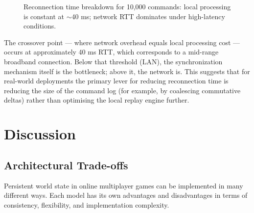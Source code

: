 \documentclass{article}
\begin{document}
\begin{figure}[h]
\centering
{}
\caption{Reconnection time breakdown for 10{,}000 commands: local processing is constant at $\sim$40 ms; network RTT dominates under high-latency conditions.}
\label{fig:network}
\end{figure}

The crossover point — where network overhead equals local processing cost — occurs at approximately 40 ms RTT, which corresponds to a mid-range broadband connection. Below that threshold (LAN), the synchronization mechanism itself is the bottleneck; above it, the network is. This suggests that for real-world deployments the primary lever for reducing reconnection time is reducing the size of the command log (for example, by coalescing commutative deltas) rather than optimising the local replay engine further.

\newpage

\section{Discussion}
\label{sec:discussion}

\subsection{Architectural Trade-offs}

Persistent world state in online multiplayer games can be implemented in many different ways. Each model has its own advantages and disadvantages in terms of consistency, flexibility, and implementation complexity.
\end{document}
